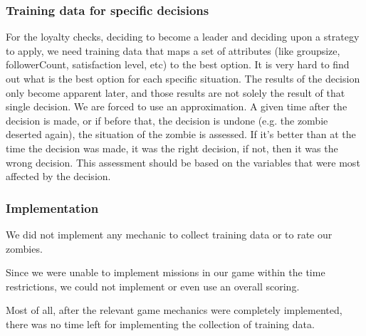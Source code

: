 \subsubsection{Training data for specific decisions}
For the loyalty checks, deciding to become a leader and deciding upon a strategy to apply, we need training data that maps a set of attributes (like groupsize, followerCount, satisfaction level, etc) to the best option. It is very hard to find out what is the best option for each specific situation. The results of the decision only become apparent later, and those results are not solely the result of that single decision. We are forced to use an approximation. A given time after the decision is made, or if before that, the decision is undone (e.g. the zombie deserted again), the situation of the zombie is assessed. If it's better than at the time the decision was made, it was the right decision, if not, then it was the wrong decision. This assessment should be based on the variables that were most affected by the decision.

\subsubsection{Implementation}
We did not implement any mechanic to collect training data or to rate our zombies.

Since we were unable to implement missions in our game within the time restrictions, we could not implement or even use an overall scoring.

Most of all, after the relevant game mechanics were completely implemented, there was no time left for implementing the collection of training data.

\FloatBarrier